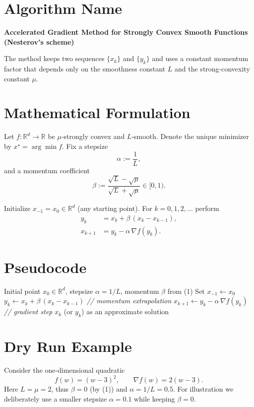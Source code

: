 \documentclass{article}
\begin{document}
\section*{Algorithm Name}
\textbf{Accelerated Gradient Method for Strongly Convex Smooth Functions (Nesterov’s scheme)}  

The method keeps two sequences $\{x_k\}$ and $\{y_k\}$ and uses a constant momentum factor that depends only on the smoothness constant $L$ and the strong‑convexity constant $\mu$.

\section*{Mathematical Formulation}
Let $f:\mathbb{R}^d\rightarrow\mathbb{R}$ be $\mu$‑strongly convex and $L$‑smooth.  
Denote the unique minimizer by $x^\star=\arg\min f$.  
Fix a stepsize 
\[
\alpha:=\frac{1}{L},
\]
and a momentum coefficient 
\[
\beta:=\frac{\sqrt{L}-\sqrt{\mu}}{\sqrt{L}+\sqrt{\mu}}\in[0,1). \tag{1}
\]

Initialize $x_{-1}=x_0\in\mathbb{R}^d$ (any starting point).  
For $k=0,1,2,\dots$ perform
\[
\boxed{
\begin{aligned}
y_k &= x_k + \beta\,(x_k-x_{k-1}),\\[2mm]
x_{k+1} &= y_k - \alpha \,\nabla f(y_k).
\end{aligned}}
\tag{2}
\]

\section*{Pseudocode}
\begin{algorithm}[H]
\caption{Accelerated Gradient for $\mu$‑strongly convex, $L$‑smooth $f$}
\begin{algorithmic}[1]
\REQUIRE Initial point $x_0\in\mathbb{R}^d$, stepsize $\alpha=1/L$, momentum $\beta$ from (1)
\STATE Set $x_{-1}\leftarrow x_0$
    \STATE $y_k \leftarrow x_k + \beta\,(x_k-x_{k-1})$ \hfill\textit{// momentum extrapolation}
    \STATE $x_{k+1} \leftarrow y_k - \alpha\,\nabla f(y_k)$ \hfill\textit{// gradient step}
\ENDFOR
\ENSURE $x_{k}$ (or $y_k$) as an approximate solution
\end{algorithmic}
\end{algorithm}

\section*{Dry Run Example}
Consider the one‑dimensional quadratic
\[
f(w)=(w-3)^2,\qquad \nabla f(w)=2(w-3).
\]
Here $L=\mu=2$, thus $\beta=0$ (by (1)) and $\alpha=1/L=0.5$.  
For illustration we deliberately use a smaller stepsize $\alpha=0.1$ while keeping $\beta=0$.
\end{document}
